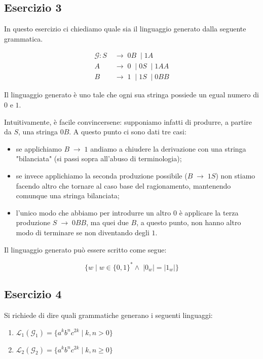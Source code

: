 \documentclass[class=book, crop=false, oneside, 12pt]{standalone}
\begin{document}
\subsection*{Esercizio 3}
In questo esercizio ci chiediamo quale sia il linguaggio generato dalla seguente grammatica.

\begin{align*}
  \mathcal{G}: S\; &\to\; 0B\; \mid 1A \\
  A\; &\to\; 0\; \mid 0S\; \mid 1AA \\
  B\; &\to\; 1\; \mid 1S\; \mid 0BB
\end{align*}

\noindent Il linguaggio generato è uno tale che ogni sua stringa possiede un egual numero di \(0\) e \(1\).

Intuitivamente, è facile convincersene: supponiamo infatti di produrre, a partire da \(S\), una stringa \(0B\). A questo punto ci sono dati tre casi:

\begin{itemize}
  \item se applichiamo \(B\; \to\; 1\) andiamo a chiudere la derivazione con una stringa "bilanciata" (si passi sopra all'abuso di terminologia);
  \item se invece applichiamo la seconda produzione possibile (\(B\; \to\; 1S\)) non stiamo facendo altro che tornare al caso base del ragionamento, mantenendo comunque una stringa bilanciata;
  \item l'unico modo che abbiamo per introdurre un altro \(0\) è applicare la terza produzione \(S\; \to\; 0BB\), ma quei due \(B\), a questo punto, non hanno altro modo di terminare se non diventando degli \(1\).
\end{itemize}

\noindent Il linguaggio generato può essere scritto come segue:

\begin{equation*}
  \{ w \mid w \in \{0, 1\}^* \land\; |0_w| = |1_w| \}
\end{equation*}

\subsection*{Esercizio 4}
Si richiede di dire quali grammatiche generano i seguenti linguaggi:

\begin{enumerate}
  \item \(\mathcal{L}_1(\mathcal{G}_1) = \{ a^k b^n c^{2k} \mid k, n > 0 \}\)
  \item \(\mathcal{L}_2(\mathcal{G}_2) = \{ a^k b^n c^{2k} \mid k, n \geq 0 \}\)
\end{enumerate}
\end{document}

